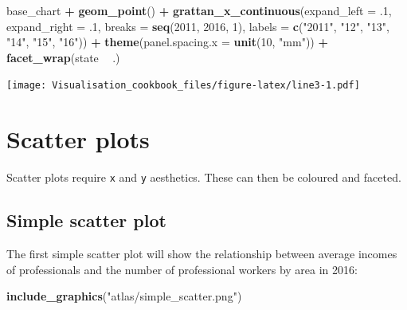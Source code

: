 \documentclass[]{book}
\newenvironment{Shaded}{\begin{snugshade}}{\end{snugshade}}
\newcommand{\DataTypeTok}[1]{\textcolor[rgb]{0.13,0.29,0.53}{#1}}
\newcommand{\DecValTok}[1]{\textcolor[rgb]{0.00,0.00,0.81}{#1}}
\newcommand{\FloatTok}[1]{\textcolor[rgb]{0.00,0.00,0.81}{#1}}
\newcommand{\KeywordTok}[1]{\textcolor[rgb]{0.13,0.29,0.53}{\textbf{#1}}}
\newcommand{\NormalTok}[1]{#1}
\newcommand{\OperatorTok}[1]{\textcolor[rgb]{0.81,0.36,0.00}{\textbf{#1}}}
\newcommand{\StringTok}[1]{\textcolor[rgb]{0.31,0.60,0.02}{#1}}
\begin{document}
\begin{Shaded}
\begin{Highlighting}[]
\NormalTok{base_chart }\OperatorTok{+}
\StringTok{  }\KeywordTok{geom_point}\NormalTok{() }\OperatorTok{+}
\StringTok{    }\KeywordTok{grattan_x_continuous}\NormalTok{(}\DataTypeTok{expand_left =} \FloatTok{.1}\NormalTok{, }
                         \DataTypeTok{expand_right =} \FloatTok{.1}\NormalTok{,}
                         \DataTypeTok{breaks =} \KeywordTok{seq}\NormalTok{(}\DecValTok{2011}\NormalTok{, }\DecValTok{2016}\NormalTok{, }\DecValTok{1}\NormalTok{),}
                         \DataTypeTok{labels =} \KeywordTok{c}\NormalTok{(}\StringTok{"2011"}\NormalTok{, }\StringTok{"12"}\NormalTok{, }\StringTok{"13"}\NormalTok{, }\StringTok{"14"}\NormalTok{, }\StringTok{"15"}\NormalTok{, }\StringTok{"16"}\NormalTok{)) }\OperatorTok{+}\StringTok{ }
\StringTok{  }\KeywordTok{theme}\NormalTok{(}\DataTypeTok{panel.spacing.x =} \KeywordTok{unit}\NormalTok{(}\DecValTok{10}\NormalTok{, }\StringTok{"mm"}\NormalTok{)) }\OperatorTok{+}\StringTok{ }
\StringTok{  }\KeywordTok{facet_wrap}\NormalTok{(state }\OperatorTok{~}\StringTok{ }\NormalTok{.)}
\end{Highlighting}
\end{Shaded}

\texttt{[image: Visualisation\_cookbook\_files/figure-latex/line3-1.pdf]}

\hypertarget{scatter-plots}{%
\section{Scatter plots}\label{scatter-plots}}

Scatter plots require \texttt{x} and \texttt{y} aesthetics. These can then be coloured and faceted.

\hypertarget{simple-scatter-plot}{%
\subsection{Simple scatter plot}\label{simple-scatter-plot}}

The first simple scatter plot will show the relationship between average incomes of professionals and the number of professional workers by area in 2016:

\begin{Shaded}
\begin{Highlighting}[]
\KeywordTok{include_graphics}\NormalTok{(}\StringTok{"atlas/simple_scatter.png"}\NormalTok{)}
\end{Highlighting}
\end{Shaded}
\end{document}

